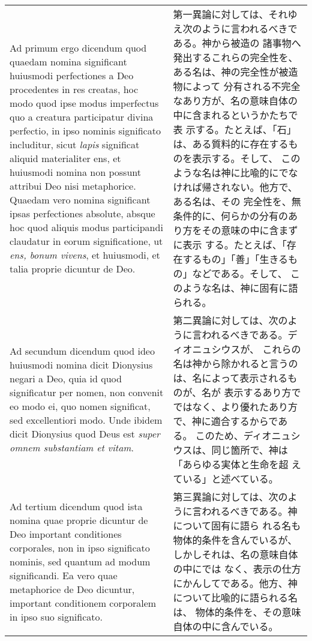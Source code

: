 \documentclass[10pt]{jsarticle}
\begin{document}
\begin{longtable}{p{21em}p{21em}}
\\

{\sc Ad primum ergo dicendum} quod quaedam nomina significant
huiusmodi perfectiones a Deo procedentes in res creatas, hoc modo quod
ipse modus imperfectus quo a creatura participatur divina perfectio,
in ipso nominis significato includitur, sicut {\it lapis} significat
aliquid materialiter ens, et huiusmodi nomina non possunt attribui Deo
nisi metaphorice. Quaedam vero nomina significant ipsas perfectiones
absolute, absque hoc quod aliquis modus participandi claudatur in
eorum significatione, ut {\it ens, bonum vivens}, et huiusmodi, et
talia proprie dicuntur de Deo.

&

第一異論に対しては、それゆえ次のように言われるべきである。神から被造の
諸事物へ発出するこれらの完全性を、ある名は、神の完全性が被造物によって
分有される不完全なあり方が、名の意味自体の中に含まれるというかたちで表
示する。たとえば、「石」は、ある質料的に存在するものを表示する。そして、
このような名は神に比喩的にでなければ帰されない。他方で、ある名は、その
完全性を、無条件的に、何らかの分有のあり方をその意味の中に含まずに表示
する。たとえば、「存在するもの」「善」「生きるもの」などである。そして、
このような名は、神に固有に語られる。

\\

{\sc Ad secundum dicendum} quod ideo huiusmodi nomina dicit Dionysius
negari a Deo, quia id quod significatur per nomen, non convenit eo
modo ei, quo nomen significat, sed excellentiori modo. Unde ibidem
dicit Dionysius quod Deus est {\it super omnem substantiam et vitam}.

&

第二異論に対しては、次のように言われるべきである。ディオニュシウスが、
これらの名は神から除かれると言うのは、名によって表示されるものが、名が
表示するあり方でではなく、より優れたあり方で、神に適合するからである。
このため、ディオニュシウスは、同じ箇所で、神は「あらゆる実体と生命を超
えている」と述べている。

\\

{\sc Ad tertium dicendum} quod ista nomina quae proprie dicuntur de
Deo important conditiones corporales, non in ipso significato nominis,
sed quantum ad modum significandi. Ea vero quae metaphorice de Deo
dicuntur, important conditionem corporalem in ipso suo significato.

&

第三異論に対しては、次のように言われるべきである。神について固有に語ら
れる名も物体的条件を含んでいるが、しかしそれは、名の意味自体の中にでは
なく、表示の仕方にかんしてである。他方、神について比喩的に語られる名は、
物体的条件を、その意味自体の中に含んでいる。

\\

\end{longtable}
\end{document}
